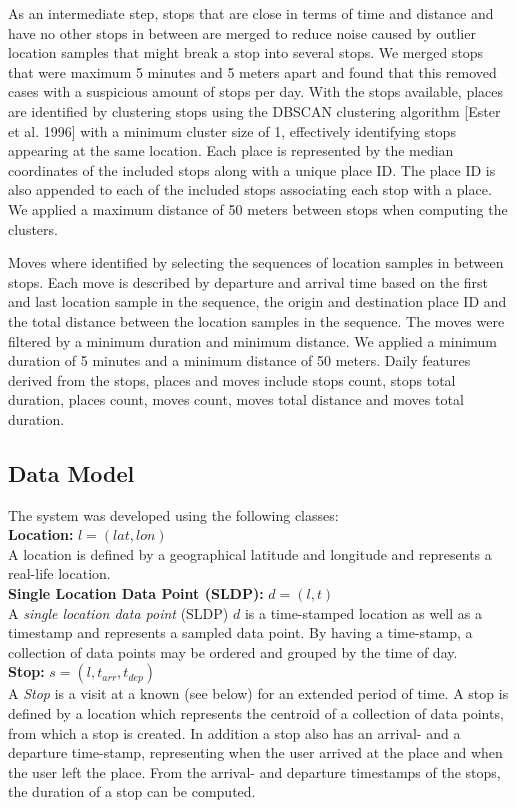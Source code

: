 As an intermediate step, stops that are close in terms of time and distance and have no other stops in between are merged to reduce noise caused by outlier location samples that might break a stop into several stops. We merged stops that were maximum 5 minutes and 5 meters apart and found that this removed cases with a suspicious amount of stops per day. With the stops available, places are identified by clustering stops using the DBSCAN clustering algorithm [Ester et al. 1996] with a minimum cluster size of 1, effectively identifying stops appearing at the same location. Each place is represented by the median coordinates of the included stops along with a unique place ID. The place ID is also appended to each of the included stops associating each stop with a place. We applied a maximum distance of 50 meters between stops when computing the clusters.

Moves where identified by selecting the sequences of location samples in between stops. Each move is described by departure and arrival time based on the first and last location sample in the sequence, the origin and destination place ID and the total distance between the location samples in the sequence. The moves were filtered by a minimum duration and minimum distance. We applied a minimum duration of 5 minutes and a minimum distance of 50 meters. Daily features derived from the stops, places and moves include stops count, stops total duration, places count, moves count, moves total distance and moves total duration.

\subsection{Data Model}
The system was developed using the following classes:\\

\textbf{Location:} $l = (lat, lon)$ \\ 
A location is defined by a geographical latitude and longitude and represents a real-life location.\\

\textbf{Single Location Data Point (SLDP):} $d = (l, t)$\\
A \textit{single location data point} (SLDP) $d$ is a time-stamped location as well as a timestamp and represents a sampled data point. By having a time-stamp, a collection of data points may be ordered and grouped by the time of day.\\

\textbf{Stop:} $s = (l, t_{arr}, t_{dep})$\\
A \textit{Stop} is a visit at a known  (see below) for an extended period of time. A stop is defined by a location which represents the centroid of a collection of data points, from which a stop is created. In addition a stop also has an arrival- and a departure time-stamp, representing when the user arrived at the place and when the user left the place. From the arrival- and departure timestamps of the stops, the duration of a stop can be computed.\\

